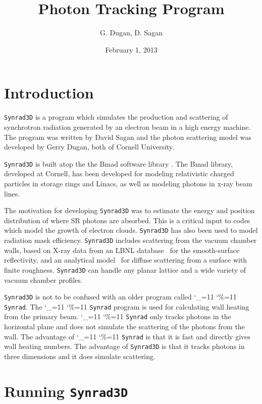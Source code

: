\documentclass[11pt]{article}
\title{ \srthree Photon Tracking Program}
\author{G. Dugan, D. Sagan}
\date{February 1, 2013}
\newcommand{\srthree}{\texttt{Synrad3D}\xspace}
\newcommand\ttcmd{\begingroup\catcode`\_=11 \catcode`\%=11 \dottcmd}
\newcommand\dottcmd[1]{\texttt{#1}\endgroup}
\newcommand{\vn}{\ttcmd}
\begin{document}
\maketitle

\tableofcontents

\section{Introduction} 
\label{s:intro}

\srthree is a program which simulates the production and scattering of
synchrotron radiation generated by an electron beam in a high energy
machine. The program was written by David Sagan and the photon
scattering model was developed by Gerry Dugan, both of Cornell
University.

\srthree is built atop the the Bmad software library
\cite{b:bmad}. The Bmad library, developed at Cornell, has been
developed for modeling relativistic charged particles in storage rings
and Linacs, as well as modeling photons in x-ray beam lines.

The motivation for developing \srthree was to estimate the energy and
position distribution of where SR photons are absorbed. This is a
critical input to codes which model the growth of electron clouds.
\srthree has also been used to model radiation mask efficiency.
\srthree includes scattering from the vacuum chamber walls, based on
X-ray data from an LBNL database~\cite{b:henke} for the smooth-surface
reflectivity, and an analytical model~\cite{b:beckmann,b:ogilvy} for
diffuse scattering from a surface with finite roughness. \srthree can
handle any planar lattice and a wide variety of vacuum chamber
profiles.

\srthree is not to be confused with an older program called
\vn{Synrad}. The \vn{Synrad} program is used for calculating wall
heating from the primary beam. \vn{Synrad} only tracks photons in the
horizontal plane and does not simulate the scattering of the photons
from the wall. The advantage of \vn{Synrad} is that it is fast and
directly gives wall heating numbers. The advantage of \srthree is that
it tracks photons in three dimensions and it does simulate scattering.

\section{Running \srthree} 
\label{s:run}
\end{document}

